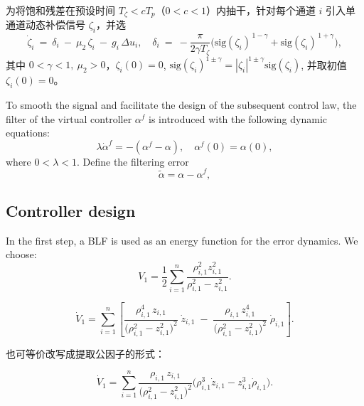 \documentclass[pdflatex,sn-mathphys-num]{sn-jnl}%
\theoremstyle{thmstyleone}%
\theoremstyle{thmstyletwo}%
\theoremstyle{thmstylethree}%
\begin{document}
为将饱和残差在预设时间 $T_\zeta<cT_p$（$0<c<1$）内抽干，针对每个通道 $i$ 引入单通道动态补偿信号 $\zeta_{i}$，并选
\begin{equation}\label{eq:zeta2-pts}
\dot\zeta_i \ =\ \delta_i\ -\ \mu_2\,\zeta_i\ -\ g_i\,\Delta u_i,\quad
\delta_i\ =\ -\frac{\pi}{2\gamma T_\zeta}\Big(\mathrm{sig}(\zeta_i)^{\,1-\gamma}+\mathrm{sig}(\zeta_i)^{\,1+\gamma}\Big),
\end{equation}
其中 $0<\gamma<1,\ \mu_2>0$，$\zeta_i(0)=0$, $\mathrm{sig}(\zeta_i)^{1\pm \gamma}=|\zeta_i|^{1\pm \gamma}\mathrm{sig}(\zeta_i)$, 并取初值 $\zeta_{i}(0)=0$。



 To smooth the signal and facilitate the design of the subsequent control law, the filter of the virtual controller $\alpha^{f}$ is introduced with the following dynamic equations:
\begin{equation}\label{eq:22}
	\lambda \dot{\alpha}^{f}
	= -\left(\alpha^{f}-\alpha\right),
	\quad
	\alpha^{f}(0)=\alpha(0),
\end{equation}
where $0<\lambda<1$. Define the filtering error 
\begin{equation}\label{eq:23}
	\tilde{\alpha}= \alpha-\alpha^{f},
\end{equation}


\subsection{Controller design}



In the first step, a BLF is used as an energy function for the error dynamics. We choose:
\begin{equation}\label{eq:25}
	V_1= \frac{1}{2}\sum_{i=1}^{n} \frac{\rho_{i,1}^2 z_{i,1}^2}{\rho_{i,1}^2-z_{i,1}^2}. 
\end{equation}



$$
\boxed{\;
\dot V_1
=\sum_{i=1}^{n}\left[
\frac{\rho_{i,1}^4\,z_{i,1}}{\big(\rho_{i,1}^{2}-z_{i,1}^{2}\big)^{2}}\;\dot z_{i,1}
\;-\;
\frac{\rho_{i,1}\,z_{i,1}^{4}}{\big(\rho_{i,1}^{2}-z_{i,1}^{2}\big)^{2}}\;\dot \rho_{i,1}
\right].\;}
$$

也可等价改写成提取公因子的形式：

$$
\dot V_1
=\sum_{i=1}^{n}
\frac{\rho_{i,1}\,z_{i,1}}{\big(\rho_{i,1}^{2}-z_{i,1}^{2}\big)^{2}}
\Big(\rho_{i,1}^{3}\dot z_{i,1}-z_{i,1}^{3}\dot\rho_{i,1}\Big).
$$
\end{document}
